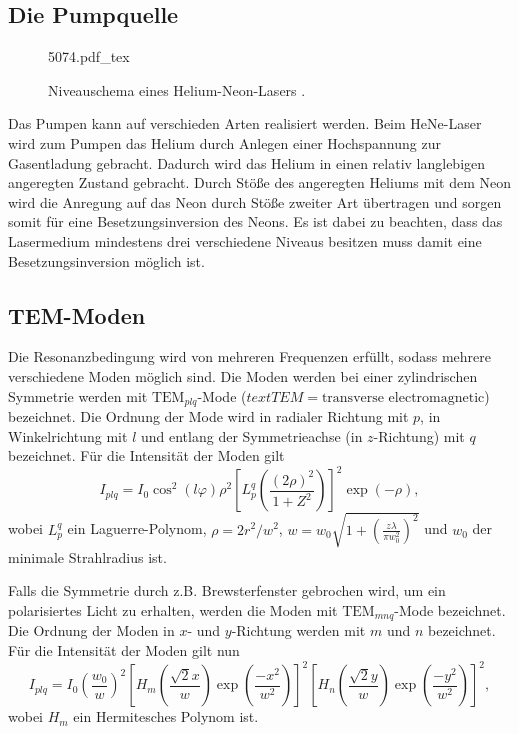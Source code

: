 \subsection{Die Pumpquelle}
\begin{figure}
	\centering
	\def\svgwidth{0.5\linewidth}
	{5074.pdf_tex}
	\caption{Niveauschema eines Helium-Neon-Lasers \cite{VHeNeGoettingen}.}
\end{figure}
Das Pumpen kann auf verschieden Arten realisiert werden. Beim HeNe-Laser wird zum Pumpen das Helium durch Anlegen einer Hochspannung zur Gasentladung gebracht. Dadurch wird das Helium in einen relativ langlebigen angeregten Zustand gebracht. Durch Stöße des angeregten Heliums mit dem Neon wird die Anregung auf das Neon durch Stöße zweiter Art übertragen und sorgen somit für eine Besetzungsinversion des Neons. Es ist dabei zu beachten, dass das Lasermedium mindestens drei verschiedene Niveaus besitzen muss damit eine Besetzungsinversion möglich ist.


\subsection{TEM-Moden}
Die Resonanzbedingung wird von mehreren Frequenzen erfüllt, sodass mehrere verschiedene Moden möglich sind. Die Moden werden bei einer zylindrischen Symmetrie werden mit $\text{TEM}_{plq}$-Mode ($text{TEM}=\text{transverse electromagnetic}$) bezeichnet. Die Ordnung der Mode wird in radialer Richtung mit $p$, in Winkelrichtung mit $l$ und entlang der Symmetrieachse (in $z$-Richtung) mit $q$ bezeichnet. Für die Intensität der Moden gilt
\begin{equation}
	I_{plq} = I_0 \cos^2 (l \varphi) \rho^2 \left[L_{p}^q\left(\frac{(2 \rho)^2}{1+Z^2} \right)\right] ^2 \exp\left(-\rho \right),
\end{equation}
wobei $L_{p}^q$ ein Laguerre-Polynom, $\rho=2 r^2 / w^2$, $w=w_0 \sqrt{1+\left(\frac{z \lambda}{\pi w_0^2}\right)^2}$ und $w_0$ der minimale Strahlradius ist.

Falls die Symmetrie durch z.B. Brewsterfenster gebrochen wird, um ein polarisiertes Licht zu erhalten, werden die Moden mit  $\text{TEM}_{mnq}$-Mode bezeichnet. Die Ordnung der Moden in $x$- und $y$-Richtung werden mit $m$ und $n$ bezeichnet. Für die Intensität der Moden gilt nun
\begin{equation}
I_{plq} = I_0 \left(\frac{w_0}{w}\right)^2 \left[H_m\left(\frac{\sqrt{2} x}{w}\right) \exp\left(\frac{-x^2}{w^2}\right) \right]^2 \left[H_n\left(\frac{\sqrt{2} y}{w}\right) \exp\left(\frac{-y^2}{w^2}\right) \right]^2, \label{eq:tem}
\end{equation}
wobei $H_m$ ein Hermitesches Polynom ist.

